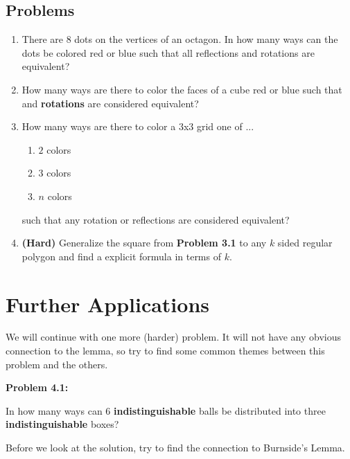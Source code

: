 \documentclass[11pt]{scrartcl}
\begin{document}
\subsection{Problems}
\begin{enumerate}
    \item There are $8$ dots on the vertices of an octagon. In how many ways can the dots be colored red or blue such that all reflections and rotations are equivalent?
    \item How many ways are there to color the faces of a cube red or blue such that and \color{blue} \textbf{rotations} \color{black} are considered equivalent?
    \item How many ways are there to color a $3$x$3$ grid one of ...
    \begin{enumerate}
        \item $2$ colors
        \item $3$ colors
        \item $n$ colors
    \end{enumerate}
    such that any rotation or reflections are considered equivalent?
    \item \textbf{(Hard)} Generalize the square from \color{red} \textbf{Problem 3.1} \color{black} to any $k$ sided regular polygon and find a explicit formula in terms of $k$.
\end{enumerate}

\section{Further Applications}

We will continue with one more (harder) problem. It will not have any obvious connection to the lemma, so try to find some common themes between this problem and the others.

\begin{tcolorbox}[colback=red!5!white,colframe=red!75!black]
  \color{red} \textbf{Problem 4.1:} \color{black}
  \vspace{0.1cm}
  
  In how many ways can $6$ \color{blue} \textbf{indistinguishable} \color{black} balls be distributed into three \color{blue} \textbf{indistinguishable} \color{black} boxes?
\end{tcolorbox}

Before we look at the solution, try to find the connection to Burnside's Lemma. 

\vspace{0.2cm}
\end{document}
